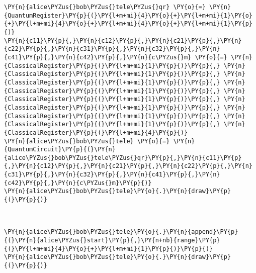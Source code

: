     \begin{tcolorbox}[breakable, size=fbox, boxrule=1pt, pad at break*=1mm,colback=cellbackground, colframe=cellborder]
\begin{Verbatim}[commandchars=\\\{\}]
\PY{n}{alice\PYZus{}bob\PYZus{}tele\PYZus{}qr} \PY{o}{=} \PY{n}{QuantumRegister}\PY{p}{(}\PY{l+m+mi}{4}\PY{o}{+}\PY{l+m+mi}{1}\PY{o}{+}\PY{l+m+mi}{4}\PY{o}{+}\PY{l+m+mi}{4}\PY{o}{+}\PY{l+m+mi}{1}\PY{p}{)}
\PY{n}{c11}\PY{p}{,}\PY{n}{c12}\PY{p}{,}\PY{n}{c21}\PY{p}{,}\PY{n}{c22}\PY{p}{,}\PY{n}{c31}\PY{p}{,}\PY{n}{c32}\PY{p}{,}\PY{n}{c41}\PY{p}{,}\PY{n}{c42}\PY{p}{,}\PY{n}{c\PYZus{}m} \PY{o}{=} \PY{n}{ClassicalRegister}\PY{p}{(}\PY{l+m+mi}{1}\PY{p}{)}\PY{p}{,} \PY{n}{ClassicalRegister}\PY{p}{(}\PY{l+m+mi}{1}\PY{p}{)}\PY{p}{,} \PY{n}{ClassicalRegister}\PY{p}{(}\PY{l+m+mi}{1}\PY{p}{)}\PY{p}{,} \PY{n}{ClassicalRegister}\PY{p}{(}\PY{l+m+mi}{1}\PY{p}{)}\PY{p}{,} \PY{n}{ClassicalRegister}\PY{p}{(}\PY{l+m+mi}{1}\PY{p}{)}\PY{p}{,} \PY{n}{ClassicalRegister}\PY{p}{(}\PY{l+m+mi}{1}\PY{p}{)}\PY{p}{,} \PY{n}{ClassicalRegister}\PY{p}{(}\PY{l+m+mi}{1}\PY{p}{)}\PY{p}{,} \PY{n}{ClassicalRegister}\PY{p}{(}\PY{l+m+mi}{1}\PY{p}{)}\PY{p}{,} \PY{n}{ClassicalRegister}\PY{p}{(}\PY{l+m+mi}{4}\PY{p}{)}
\PY{n}{alice\PYZus{}bob\PYZus{}tele} \PY{o}{=} \PY{n}{QuantumCircuit}\PY{p}{(}\PY{n}{alice\PYZus{}bob\PYZus{}tele\PYZus{}qr}\PY{p}{,}\PY{n}{c11}\PY{p}{,}\PY{n}{c12}\PY{p}{,}\PY{n}{c21}\PY{p}{,}\PY{n}{c22}\PY{p}{,}\PY{n}{c31}\PY{p}{,}\PY{n}{c32}\PY{p}{,}\PY{n}{c41}\PY{p}{,}\PY{n}{c42}\PY{p}{,}\PY{n}{c\PYZus{}m}\PY{p}{)}
\PY{n}{alice\PYZus{}bob\PYZus{}tele}\PY{o}{.}\PY{n}{draw}\PY{p}{(}\PY{p}{)}
\end{Verbatim}
\end{tcolorbox}
 
            
    
    \begin{center}
    \end{center}
    { \hspace*{\fill} \\}
    

    \begin{tcolorbox}[breakable, size=fbox, boxrule=1pt, pad at break*=1mm,colback=cellbackground, colframe=cellborder]
\begin{Verbatim}[commandchars=\\\{\}]
\PY{n}{alice\PYZus{}bob\PYZus{}tele}\PY{o}{.}\PY{n}{append}\PY{p}{(}\PY{n}{alice\PYZus{}start}\PY{p}{,}\PY{n+nb}{range}\PY{p}{(}\PY{l+m+mi}{4}\PY{o}{+}\PY{l+m+mi}{1}\PY{p}{)}\PY{p}{)}
\PY{n}{alice\PYZus{}bob\PYZus{}tele}\PY{o}{.}\PY{n}{draw}\PY{p}{(}\PY{p}{)}
\end{Verbatim}
\end{tcolorbox}
 
